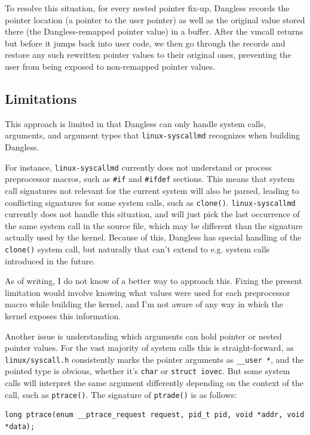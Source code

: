 To resolve this situation, for every nested pointer fix-up, Dangless records the pointer location (a pointer to the user pointer) as well as the original value stored there (the Dangless-remapped pointer value) in a buffer. After the vmcall returns but before it jumps back into user code, we then go through the records and restore any such rewritten pointer values to their original ones, preventing the user from being exposed to non-remapped pointer values.

\subsection{Limitations}

This approach is limited in that Dangless can only handle system calls, arguments, and argument types that \texttt{linux-syscallmd} recognizes when building Dangless.

For instance, \texttt{linux-syscallmd} currently does not understand or process preprocessor macros, such as \lstinline!#if! and \lstinline!#ifdef! sections. This means that system call signatures not relevant for the current system will also be parsed, leading to conflicting signatures for some system calls, such as \lstinline!clone()!. \texttt{linux-syscallmd} currently does not handle this situation, and will just pick the last occurrence of the same system call in the source file, which may be different than the signature actually used by the kernel. Because of this, Dangless has special handling of the \lstinline!clone()! system call, but naturally that can't extend to e.g. system calls introduced in the future.

As of writing, I do not know of a better way to approach this. Fixing the present limitation would involve knowing what values were used for each preprocessor macro while building the kernel, and I'm not aware of any way in which the kernel exposes this information.

Another issue is understanding which arguments can hold pointer or nested pointer values. For the vast majority of system calls this is straight-forward, as \texttt{linux/syscall.h} consistently marks the pointer arguments as \lstinline!__user *!, and the pointed type is obvious, whether it's \lstinline!char! or \lstinline!struct iovec!. But some system calls will interpret the same argument differently depending on the context of the call, such as \lstinline!ptrace()!. The signature of \lstinline!ptrade()! is as follows:

\begin{lstlisting}
long ptrace(enum __ptrace_request request, pid_t pid, void *addr, void *data);
\end{lstlisting}

